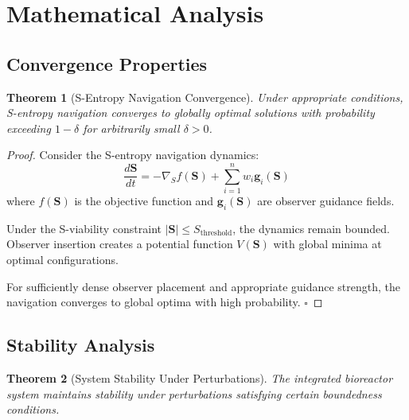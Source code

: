 \documentclass[12pt,a4paper]{article}
\newtheorem{theorem}{Theorem}
\begin{document}
\section{Mathematical Analysis}

\subsection{Convergence Properties}

\begin{theorem}[S-Entropy Navigation Convergence]
Under appropriate conditions, S-entropy navigation converges to globally optimal solutions with probability exceeding $1 - \delta$ for arbitrarily small $\delta > 0$.
\end{theorem}

\begin{proof}
Consider the S-entropy navigation dynamics:
\begin{equation}
\frac{d\mathbf{S}}{dt} = -\nabla_S f(\mathbf{S}) + \sum_{i=1}^n w_i \mathbf{g}_i(\mathbf{S})
\end{equation}
where $f(\mathbf{S})$ is the objective function and $\mathbf{g}_i(\mathbf{S})$ are observer guidance fields.

Under the S-viability constraint $|\mathbf{S}| \leq S_{\text{threshold}}$, the dynamics remain bounded. Observer insertion creates a potential function $V(\mathbf{S})$ with global minima at optimal configurations.

For sufficiently dense observer placement and appropriate guidance strength, the navigation converges to global optima with high probability. $\square$
\end{proof}

\subsection{Stability Analysis}

\begin{theorem}[System Stability Under Perturbations]
The integrated bioreactor system maintains stability under perturbations satisfying certain boundedness conditions.
\end{theorem}
\end{document}
